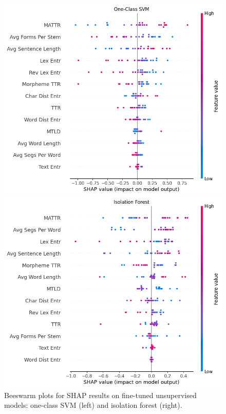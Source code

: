 \documentclass[12pt,a4paper]{article}
\numberwithin{figure}{section}
\numberwithin{table}{section}
\numberwithin{definition}{section}
\begin{document}
\begin{figure}[!h]
  \centering
  \begin{minipage}{0.5\textwidth}
    \includegraphics[width=\textwidth]{OCSVM_SHAP_values.png}
  \end{minipage}\hfill
  \begin{minipage}{0.5\textwidth}
    \includegraphics[width=\textwidth]{IF_SHAP_values.png}
  \end{minipage}
    \caption{Beeswarm plots for SHAP results on fine-tuned unsupervised models: one-class SVM (left) and isolation forest (right).}
    \label{fig:unsupervisedshap}
\end{figure}
\end{document}
